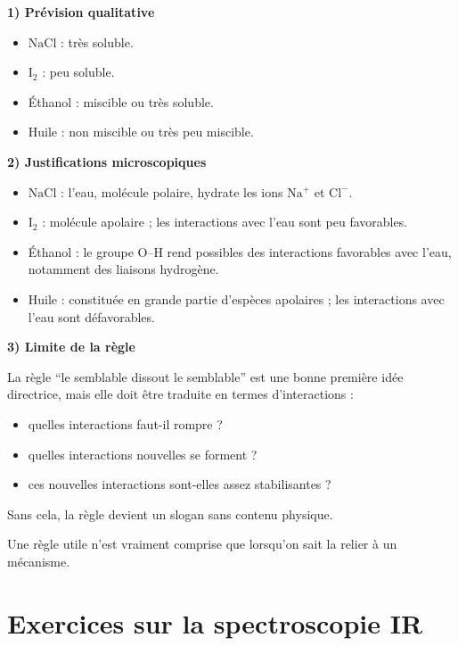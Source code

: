 \documentclass[11pt,a4paper]{article}
\begin{document}
\begin{corrigebox}
\textbf{1) Prévision qualitative}

\begin{itemize}
    \item \(\mathrm{NaCl}\) : très soluble.
    \item \(\mathrm{I_2}\) : peu soluble.
    \item Éthanol : miscible ou très soluble.
    \item Huile : non miscible ou très peu miscible.
\end{itemize}

\textbf{2) Justifications microscopiques}

\begin{itemize}
    \item \(\mathrm{NaCl}\) : l'eau, molécule polaire, hydrate les ions \(\mathrm{Na^+}\) et \(\mathrm{Cl^-}\).
    \item \(\mathrm{I_2}\) : molécule apolaire ; les interactions avec l'eau sont peu favorables.
    \item Éthanol : le groupe O--H rend possibles des interactions favorables avec l'eau, notamment des liaisons hydrogène.
    \item Huile : constituée en grande partie d'espèces apolaires ; les interactions avec l'eau sont défavorables.
\end{itemize}

\textbf{3) Limite de la règle}

La règle ``le semblable dissout le semblable'' est une bonne première idée directrice, mais elle doit être traduite en termes d'interactions :
\begin{itemize}
    \item quelles interactions faut-il rompre ?
    \item quelles interactions nouvelles se forment ?
    \item ces nouvelles interactions sont-elles assez stabilisantes ?
\end{itemize}
Sans cela, la règle devient un slogan sans contenu physique.

\begin{ideebox}
Une règle utile n'est vraiment comprise que lorsqu'on sait la relier à un mécanisme.
\end{ideebox}
\end{corrigebox}

\section{Exercices sur la spectroscopie IR}
\end{document}
